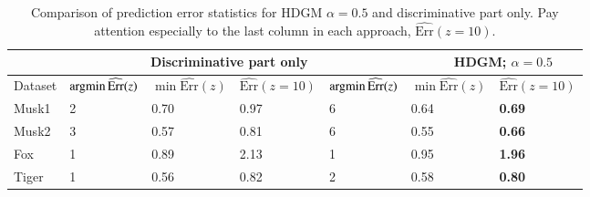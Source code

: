 \begin{table}[h]
	\centering
	\begin{tabular}{|l|l|l|l||l|l|l|}
		\hline
		& \multicolumn{3}{l||}{~~~~~~~~~~~\textbf{Discriminative part only}} & \multicolumn{3}{l|}{~~~~~~~~~~~~~~~~~\textbf{HDGM}; $\alpha=0.5$} \\ \hline
		Dataset & $\mathop{\mathrm{argmin}} \widehat{\mathrm{Err}}(z)$   & $\min \widehat{\mathrm{Err}}(z)$ &$\widehat{\mathrm{Err}}(z=10)$  &   $\mathop{\mathrm{argmin}} \widehat{\mathrm{Err}}(z)$             &     $\min \widehat{\mathrm{Err}}(z)$       &     $\widehat{\mathrm{Err}}(z=10)$         \\ \hline
		Musk1   & 2             & 0.70         & 0.97    &    6          &  0.64           &  \textbf{0.69}           \\ \hline
		Musk2   & 3              & 0.57         & 0.81    &    6          & 0.55            &  \textbf{0.66}           \\ \hline
		Fox     & 1              & 0.89         & 2.13    &    1          &  0.95           &   \textbf{1.96}          \\ \hline
		Tiger   & 1              & 0.56          & 0.82       &   2           &   0.58          &   \textbf{0.80}          \\ \hline
	\end{tabular}
	\caption{Comparison of prediction error statistics for HDGM $\alpha=0.5$ and discriminative part only. Pay attention especially to the last column in each approach, $\widehat{\mathrm{Err}}(z=10)$.}
	\label{tab:HDGMz}
\end{table}

